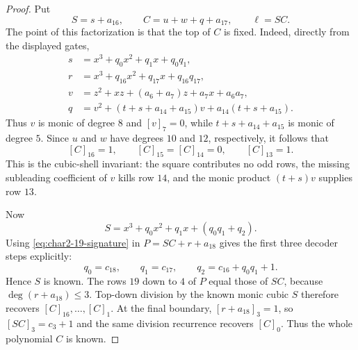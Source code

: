 \begin{proof}
Put
\[
 S=s+a_{16},\qquad C=u+w+q+a_{17},\qquad \ell=SC.                 \tag{A.17}\label{eq:char2-19-shell}
\]
The point of this factorization is that the top of $C$ is fixed.  Indeed,
directly from the displayed gates,
\[
\begin{aligned}
s&=x^3+q_0x^2+q_1x+q_0q_1,\\
r&=x^3+q_{16}x^2+q_{17}x+q_{16}q_{17},\\
v&=z^2+xz+(a_6+a_7)z+a_7x+a_6a_7,\\
q&=v^2+(t+s+a_{14}+a_{15})v+a_{14}(t+s+a_{15}).
\end{aligned}                                                     \tag{A.18}\label{eq:char2-19-terminal}
\]
Thus $v$ is monic of degree $8$ and $[v]_7=0$, while
$t+s+a_{14}+a_{15}$ is monic of degree $5$.  Since $u$ and $w$ have degrees
$10$ and $12$, respectively, it follows that
\[
 [C]_{16}=1,\qquad [C]_{15}=[C]_{14}=0,\qquad [C]_{13}=1.         \tag{A.19}\label{eq:char2-19-signature}
\]
This is the cubic-shell invariant: the square contributes no odd rows, the
missing subleading coefficient of $v$ kills row $14$, and the monic product
$(t+s)v$ supplies row $13$.

Now
\[
 S=x^3+q_0x^2+q_1x+(q_0q_1+q_2).
\]
Using \eqref{eq:char2-19-signature} in $P=SC+r+a_{18}$ gives the first three
decoder steps explicitly:
\[
 q_0=c_{18},\qquad q_1=c_{17},\qquad
 q_2=c_{16}+q_0q_1+1.                                            \tag{A.20}\label{eq:char2-19-shell-top}
\]
Hence $S$ is known.  The rows $19$ down to $4$ of $P$ equal those of $SC$,
because $\deg(r+a_{18})\le3$.  Top-down division by the known monic cubic
$S$ therefore recovers $[C]_{16},\ldots,[C]_1$.  At the final boundary,
$[r+a_{18}]_3=1$, so $[SC]_3=c_3+1$ and the same division recurrence recovers
$[C]_0$.  Thus the whole polynomial $C$ is known.


\end{proof}
